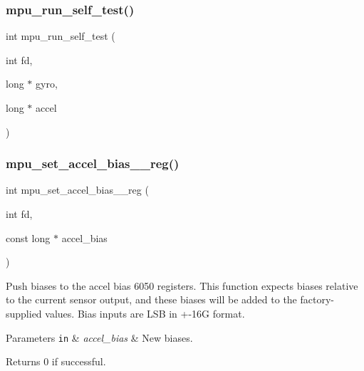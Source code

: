 \mbox{\label{group___d_r_i_v_e_r_s_gaa3dd52735ca100e9d261cc27038d5219}} 
\subsubsection{mpu\+\_\+run\+\_\+self\+\_\+test()}
{\footnotesize\ttfamily int mpu\+\_\+run\+\_\+self\+\_\+test (\begin{DoxyParamCaption}\item[{int}]{fd,  }\item[{long $\ast$}]{gyro,  }\item[{long $\ast$}]{accel }\end{DoxyParamCaption})}

\mbox{\label{group___d_r_i_v_e_r_s_ga561c166a0c829bbb4523c8682ed8d861}} 
\subsubsection{mpu\+\_\+set\+\_\+accel\+\_\+bias\+\_\+\_\+reg()}
{\footnotesize\ttfamily int mpu\+\_\+set\+\_\+accel\+\_\+bias\+\_\+\_\+reg (\begin{DoxyParamCaption}\item[{int}]{fd,  }\item[{const long $\ast$}]{accel\+\_\+bias }\end{DoxyParamCaption})}



Push biases to the accel bias 6050 registers. This function expects biases relative to the current sensor output, and these biases will be added to the factory-\/supplied values. Bias inputs are L\+SB in +-\/16G format. 


\begin{DoxyParams}[1]{Parameters}
\mbox{\tt in}  & {\em accel\+\_\+bias} & New biases. \\
\hline
\end{DoxyParams}
\begin{DoxyReturn}{Returns}
0 if successful. 
\end{DoxyReturn}
\mbox{\label{group___d_r_i_v_e_r_s_ga2f3ef8d3ee28f2792d04a2023b31b6ac}} 
